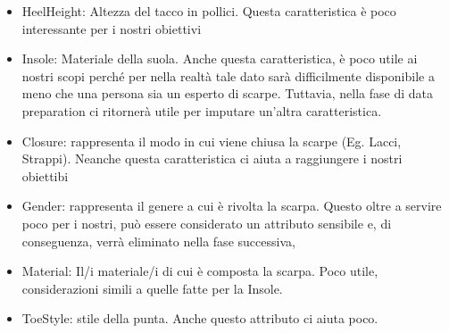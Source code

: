 \documentclass[a4paper, 11pt, oneside]{report}
\begin{document}
\begin{itemize}
\begin{center}
                    \end{center}
                    \item HeelHeight: Altezza del tacco in pollici.
                    Questa caratteristica è poco interessante per i nostri obiettivi
                    \item Insole: Materiale della suola.
                    Anche questa caratteristica, è poco utile ai nostri scopi perché per nella realtà tale dato sarà
                    difficilmente disponibile a meno che una persona sia un esperto di scarpe.
                    Tuttavia, nella fase di data preparation ci ritornerà utile per imputare un'altra caratteristica.
                    \item Closure: rappresenta il modo in cui viene chiusa la scarpe (Eg. Lacci, Strappi).
                    Neanche questa caratteristica ci aiuta a raggiungere i nostri obiettibi
                    \item Gender: rappresenta il genere a cui è rivolta la scarpa.
                    Questo oltre a servire poco per i nostri, può essere considerato un attributo sensibile e,
                    di conseguenza, verrà eliminato nella fase successiva,
                    \item Material: Il/i materiale/i di cui è composta la scarpa.
                    Poco utile, considerazioni simili a quelle fatte per la Insole.
                    \item ToeStyle: stile della punta.
                    Anche questo attributo ci aiuta poco.
                \end{itemize}
\end{document}
